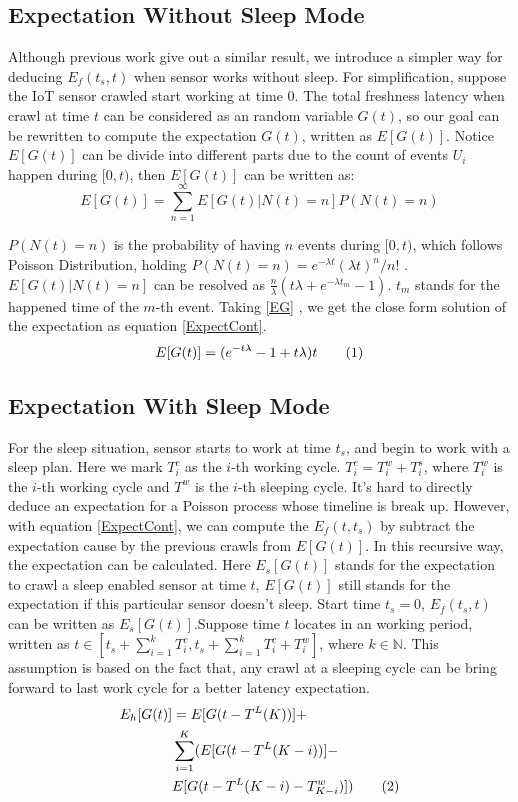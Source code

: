 \documentclass[conference]{IEEEtran}
\newcommand\numberthis{\addtocounter{equation}{1}\tag{\theequation}}
\begin{document}
\subsection{Expectation Without Sleep Mode}
Although previous work\cite{Cho2000} give out a similar result, we introduce a simpler way for deducing $E_f(t_s, t)$ when sensor works without sleep. For simplification, suppose the IoT sensor crawled start working at time $0$. The total freshness latency when crawl at time $t$ can be considered as an random variable $G(t)$, so our goal can be rewritten to compute the expectation $G(t)$, written as $E[G(t)]$. 
Notice $E[G(t)]$ can be divide into different parts due to the count of events $U_i$ happen during $[0, t)$, then $E[G(t)]$ can be written as:
\begin{equation}
E[G(t)] = \sum_{n=1}^{\infty} E[G(t)|N(t)=n]P(N(t)=n) \label{EG}
\end{equation}

$P(N(t)=n)$ is the probability of having $n$ events during $[0,t)$, which follows Poisson Distribution, holding $P(N(t)=n)=e^{-\lambda t}{(\lambda t)^n}/{n!}$ . $E[G(t)|N(t)=n]$ can be resolved as $\frac{n}{\lambda}(t\lambda+e^{-\lambda t_m}-1)$. $t_{m}$ stands for the happened time of the $m$-th event. Taking \eqref{EG} , we get the close form solution of the expectation as equation \eqref{ExpectCont}.
\begin{equation}
E[G(t)] = (e^{-t\lambda}-1+t \lambda)t \numberthis \label{ExpectCont}
\end{equation}

\subsection{Expectation With Sleep Mode}
For the sleep situation, sensor starts to work at time $t_s$, and begin to work with a sleep plan.
Here we mark $T^{c}_{i}$ as the $i$-th working cycle. $T^{c}_{i} = T^{w}_{i}+T^{s}_{i}$, where $T^{w}_{i}$ is the $i$-th working cycle and $T^{w}$ is the $i$-th sleeping cycle. 
It's hard to directly deduce an expectation for a Poisson process whose timeline is break up. However, with equation \eqref{ExpectCont}, we can compute the $E_f(t, t_s)$ by subtract the expectation cause by the previous crawls from $E[G(t)]$. In this recursive way, the expectation can be calculated. Here $E_s[G(t)]$ stands for the expectation to crawl a sleep enabled sensor at time $t$, $E[G(t)]$ still stands for the expectation if this particular sensor doesn't sleep.
Start time $t_s=0$, $E_f(t_s,t)$ can be written as $E_s[G(t)]$.Suppose time $t$ locates in an working period, written as $t \in [t_s + \sum_{i=1}^{k} T^{c}_{i}, t_s + \sum_{i=1}^{k} T^{c}_{i} + T^{w}_{i}]$, where $k\in\mathbb{N}$. This assumption is based on the fact that, any crawl at a sleeping cycle can be bring forward to last work cycle for a better latency expectation.
\begin{align*}
E_h[G(t)] & = E[G(t-T^{L}(K))] + \\
	& \sum_{i=1}^{K}(E[G(t-T^{L}(K-i))]-\\
	& E[G(t-T^{L}(K-i)-T^{w}_{K-i})]) \numberthis \label{ExpectSleep}
\end{align*}
\end{document}
